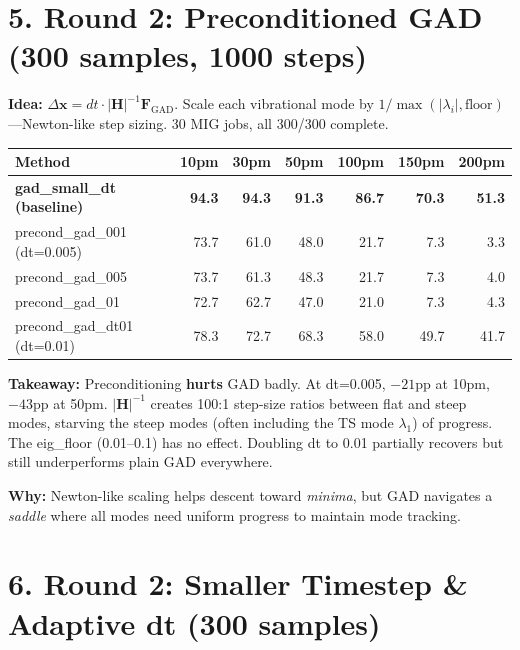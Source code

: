 \documentclass[11pt]{article}
\begin{document}
\section*{5. Round 2: Preconditioned GAD \small(300 samples, 1000 steps)}

\textbf{Idea:} $\Delta\mathbf{x} = dt \cdot |\mathbf{H}|^{-1} \mathbf{F}_{\text{GAD}}$. Scale each vibrational mode by $1/\max(|\lambda_i|, \text{floor})$---Newton-like step sizing. 30 MIG jobs, all 300/300 complete.

\begin{tabular}{l*{6}{r}}
\toprule
Method & 10pm & 30pm & 50pm & 100pm & 150pm & 200pm \\
\midrule
\textbf{gad\_small\_dt (baseline)} & \textbf{94.3} & \textbf{94.3} & \textbf{91.3} & \textbf{86.7} & \textbf{70.3} & \textbf{51.3} \\
precond\_gad\_001 (dt=0.005) & 73.7 & 61.0 & 48.0 & 21.7 & 7.3 & 3.3 \\
precond\_gad\_005            & 73.7 & 61.3 & 48.3 & 21.7 & 7.3 & 4.0 \\
precond\_gad\_01             & 72.7 & 62.7 & 47.0 & 21.0 & 7.3 & 4.3 \\
precond\_gad\_dt01 (dt=0.01) & 78.3 & 72.7 & 68.3 & 58.0 & 49.7 & 41.7 \\
\bottomrule
\end{tabular}

\textbf{Takeaway:} Preconditioning \textbf{hurts} GAD badly. At dt=0.005, $-21$pp at 10pm, $-43$pp at 50pm.
$|\mathbf{H}|^{-1}$ creates 100:1 step-size ratios between flat and steep modes,
starving the steep modes (often including the TS mode $\lambda_1$) of progress.
The eig\_floor (0.01--0.1) has no effect. Doubling dt to 0.01 partially recovers
but still underperforms plain GAD everywhere.

\textbf{Why:} Newton-like scaling helps descent toward \textit{minima}, but GAD navigates
a \textit{saddle} where all modes need uniform progress to maintain mode tracking.

\section*{6. Round 2: Smaller Timestep \& Adaptive dt \small(300 samples)}
\end{document}
